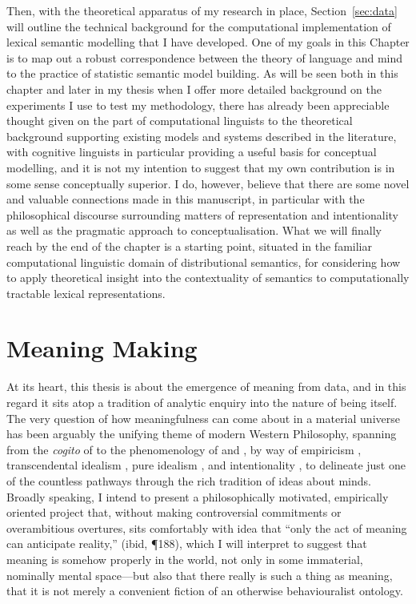 Then, with the theoretical apparatus of my research in place, Section~\ref{sec:data} will outline the technical background for the computational implementation of lexical semantic modelling that I have developed.  One of my goals in this Chapter is to map out a robust correspondence between the theory of language and mind to the practice of statistic semantic model building.  As will be seen both in this chapter and later in my thesis when I offer more detailed background on the experiments I use to test my methodology, there has already been appreciable thought given on the part of computational linguists to the theoretical background supporting existing models and systems described in the literature, with cognitive linguists in particular providing a useful basis for conceptual modelling, and it is not my intention to suggest that my own contribution is in some sense conceptually superior.  I do, however, believe that there are some novel and valuable connections made in this manuscript, in particular with the philosophical discourse surrounding matters of representation and intentionality as well as the pragmatic approach to conceptualisation.  What we will finally reach by the end of the chapter is a starting point, situated in the familiar computational linguistic domain of distributional semantics, for considering how to apply theoretical insight into the contextuality of semantics to computationally tractable lexical representations.

\section{Meaning Making} \label{sec:meanmake}
At its heart, this thesis is about the emergence of meaning from data, and in this regard it sits atop a tradition of analytic enquiry into the nature of being itself.  The very question of how meaningfulness can come about in a material universe has been arguably the unifying theme of modern Western Philosophy, spanning from the \emph{cogito} of \cite{Descartes1911} to the phenomenology of \cite{Husserl1900} and \cite{Heidegger1926}, by way of empiricism \citep{Locke1689,Hume1738}, transcendental idealism \citep{Kant1787}, pure idealism \citep{Hegel1816}, and intentionality \citep{Brentano1874}, to delineate just one of the countless pathways through the rich tradition of ideas about minds.  Broadly speaking, I intend to present a philosophically motivated, empirically oriented project that, without making controversial commitments or overambitious overtures, sits comfortably with  idea that ``only the act of meaning can anticipate reality,'' (ibid, \P 188), which I will interpret to suggest that meaning is somehow properly in the world, not only in some immaterial, nominally mental space---but also that there really is such a thing as meaning, that it is not merely a convenient fiction of an otherwise behaviouralist ontology.

